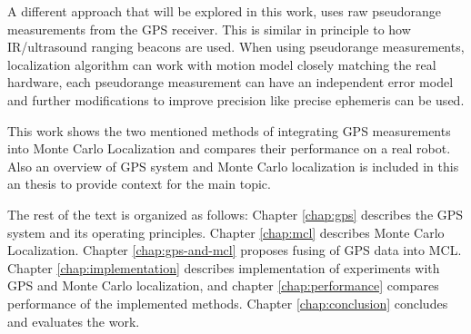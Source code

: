A different approach that will be explored in this work, uses raw
pseudorange measurements from the GPS receiver.
This is similar in principle to how IR/ultrasound ranging beacons are used.
When using pseudorange measurements, localization algorithm can work with motion model closely
matching the real hardware, each pseudorange measurement can have an
independent error model and further modifications to improve precision like precise
ephemeris can be used.


\vspace{1.5em}


This work shows the two mentioned  methods of integrating GPS measurements
into Monte Carlo Localization and compares their performance on a real robot.
Also an overview of GPS system and Monte Carlo localization is included in
this an thesis to provide context for the main topic.


The rest of the text is organized as follows:
Chapter \ref{chap:gps} describes the GPS system and its operating principles.
Chapter \ref{chap:mcl} describes Monte Carlo Localization.
Chapter \ref{chap:gps-and-mcl} proposes fusing of GPS data into MCL.
Chapter \ref{chap:implementation} describes implementation of experiments with GPS and
Monte Carlo localization,
and chapter \ref{chap:performance} compares performance of the implemented methods.
Chapter \ref{chap:conclusion} concludes and evaluates the work.

